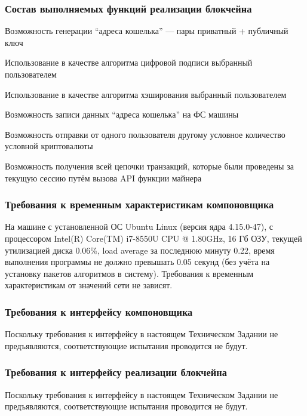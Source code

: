 \subsubsection{Состав выполняемых функций реализации блокчейна}
\begin{my_enumerate}
    \item Возможность генерации ``адреса кошелька'' --- пары приватный + публичный ключ
    \item Использование в качестве алгоритма цифровой подписи выбранный пользователем
    \item Использование в качестве алгоритма хэширования выбранный пользователем
    \item Возможность записи данных ``адреса кошелька'' на ФС машины
    \item Возможность отправки от одного пользователя другому условное
          количество условной криптовалюты
    \item Возможность получения всей цепочки транзакций, которые были проведены
          за текущую сессию путём вызова API функции майнера
\end{my_enumerate}

\subsubsection{Требования к временным характеристикам компоновщика}
На машине с установленной ОС Ubuntu Linux (версия ядра 4.15.0-47), с
процессором Intel(R) Core(TM) i7-8550U CPU @ 1.80GHz, 16 Гб ОЗУ, текущей
утилизацией диска 0.06\%, load average за последнюю минуту 0.22, время
выполнения программы не должно превышать 0.05 секунд (без учёта на установку
пакетов алгоритмов в систему). Требования к временным характеристикам от
значений сети не зависят.

\subsubsection{Требования к интерфейсу компоновщика}
Поскольку требования к интерфейсу в настоящем Техническом Задании не
предъявляются, соответствующие испытания проводится не будут.

\subsubsection{Требования к интерфейсу реализации блокчейна}
Поскольку требования к интерфейсу в настоящем Техническом Задании не
предъявляются, соответствующие испытания проводится не будут.

